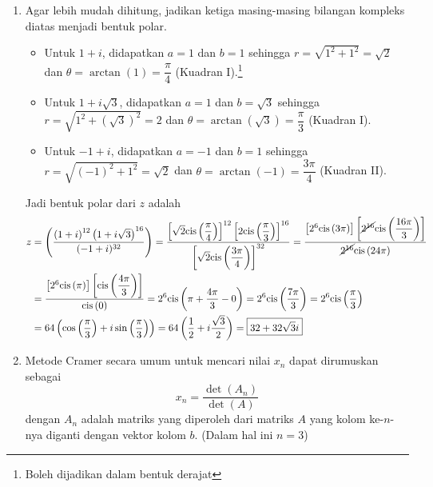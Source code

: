 \documentclass[10pt,openany,a4paper]{article}
\newcommand{\cis}{\text{cis}}
\begin{document}
\begin{enumerate}
    \item Agar lebih mudah dihitung, jadikan ketiga masing-masing bilangan kompleks diatas menjadi bentuk polar.
          \begin{itemize}
              \item Untuk $1+i$, didapatkan $a=1$ dan $b=1$ sehingga $r=\sqrt{1^2+1^2}=\sqrt{2}$ dan $\theta=\arctan\left(1\right)=\dfrac{\pi}{4}$ (Kuadran I).\footnote{Boleh dijadikan dalam bentuk derajat}
              \item Untuk $1+i\sqrt{3}$, didapatkan $a=1$ dan $b=\sqrt{3}$ sehingga $r=\sqrt{1^2+(\sqrt{3})^2}=2$ dan $\theta=\arctan\left(\sqrt{3}\right)=\dfrac{\pi}{3}$ (Kuadran I).
              \item Untuk $-1+i$, didapatkan $a=-1$ dan $b=1$ sehingga $r=\sqrt{(-1)^2+1^2}=\sqrt{2}$ dan $\theta=\arctan\left(-1\right)=\dfrac{3\pi}{4}$ (Kuadran II).
          \end{itemize}
          Jadi bentuk polar dari $z$ adalah
          \begin{align*}
              z & =\left(\frac{\left(1 + i\right)^{12}\left(1 + i\sqrt{3}\right)^{16}}{(-1 + i)^{32}}\right)=\frac{\left[\sqrt{2}\cis\left(\dfrac{\pi}{4}\right)\right]^{12}\left[2\cis\left(\dfrac{\pi}{3}\right)\right]^{16}}{\left[\sqrt{2}\cis\left(\dfrac{3\pi}{4}\right)\right]^{32}}=\frac{\left[2^{6}\cis\left(3\pi\right)\right]\left[\cancel{2^{16}}\cis\left(\dfrac{16\pi}{3}\right)\right]}{\cancel{2^{16}}\cis\left(24\pi\right)} \\
                & =\frac{\left[2^{6}\cis\left(\pi\right)\right]\left[\cis\left(\dfrac{4\pi}{3}\right)\right]}{\cis\left(0\right)}=2^{6}\cis\left(\pi+\dfrac{4\pi}{3}-0\right)=2^{6}\cis\left(\dfrac{7\pi}{3}\right)=2^{6}\cis\left(\dfrac{\pi}{3}\right)                                                                                                                                                                                       \\
                & =64\left(\cos\left(\dfrac{\pi}{3}\right)+i\sin\left(\dfrac{\pi}{3}\right)\right)=64\left(\dfrac{1}{2}+i\dfrac{\sqrt{3}}{2}\right)=\boxed{32+32\sqrt{3}i}
          \end{align*}
    \item Metode Cramer secara umum untuk mencari nilai $x_n$ dapat dirumuskan sebagai
          \[x_n=\frac{\det(A_n)}{\det(A)}\]
          dengan $A_n$ adalah matriks yang diperoleh dari matriks $A$ yang kolom ke-$n$-nya diganti dengan vektor kolom $b$. (Dalam hal ini $n=3$)


\end{enumerate}
\end{document}
